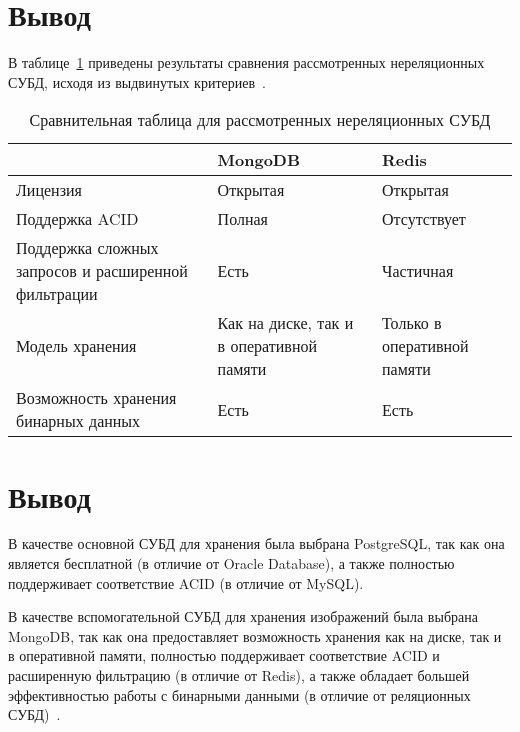 \section*{Вывод}

В таблице~\ref{table:compareNoSQLDBs} приведены результаты сравнения рассмотренных нереляционных СУБД, исходя из выдвинутых критериев~\cite{cmpNosql1}.
\begin{table}[h!]
	\begin{center}
		\caption{\label{table:compareNoSQLDBs} Сравнительная таблица для рассмотренных нереляционных СУБД}
		\begin{tabular}{|p{200pt}|p{120pt}|p{120pt}|}
			\hline
			~ & MongoDB & Redis \\ \hline
			Лицензия & Открытая & Открытая \\ \hline
			Поддержка ACID & Полная & Отсутствует \\ \hline
			Поддержка сложных запросов и расширенной фильтрации & Есть & Частичная \\ \hline
			Модель хранения & Как на диске, так и в оперативной памяти & Только в оперативной памяти \\ \hline
			Возможность хранения бинарных данных & Есть & Есть \\ \hline
		\end{tabular}
	\end{center}
\end{table}

\section{Вывод}

В качестве основной СУБД для хранения была выбрана PostgreSQL, так как она является бесплатной (в отличие от Oracle Database), а также полностью поддерживает соответствие ACID (в отличие от MySQL).

В качестве вспомогательной СУБД для хранения изображений была выбрана MongoDB, так как она предоставляет возможность хранения как на диске, так и в оперативной памяти, полностью поддерживает соответствие ACID и расширенную фильтрацию (в отличие от Redis), а также обладает большей эффективностью работы с бинарными данными (в отличие от реляционных СУБД)~\cite{cmpNosqlSCDB, cmpStoreBinary, cmpStoreBinary1}.